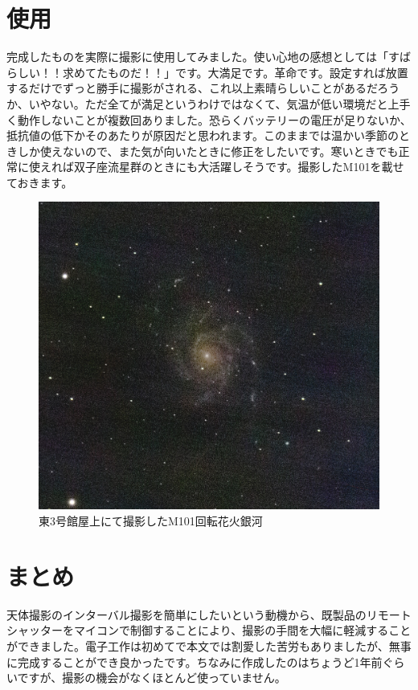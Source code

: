 \documentclass[../main]{subfiles}
\begin{document}
\section{使用}
完成したものを実際に撮影に使用してみました。使い心地の感想としては「すばらしい！！求めてたものだ！！」です。大満足です。革命です。設定すれば放置するだけでずっと勝手に撮影がされる、これ以上素晴らしいことがあるだろうか、いやない。ただ全てが満足というわけではなくて、気温が低い環境だと上手く動作しないことが複数回ありました。恐らくバッテリーの電圧が足りないか、抵抗値の低下かそのあたりが原因だと思われます。このままでは温かい季節のときしか使えないので、また気が向いたときに修正をしたいです。寒いときでも正常に使えれば双子座流星群のときにも大活躍しそうです。撮影したM101を載せておきます。
\begin{figure}[H]
    \centering
    \includegraphics[width=0.5\linewidth]{sections/Maruyama/figure/M101_0529_4.jpg}
    \caption{東3号館屋上にて撮影したM101回転花火銀河}
\end{figure}


\section{まとめ}
天体撮影のインターバル撮影を簡単にしたいという動機から、既製品のリモートシャッターをマイコンで制御することにより、撮影の手間を大幅に軽減することができました。電子工作は初めてで本文では割愛した苦労もありましたが、無事に完成することができ良かったです。ちなみに作成したのはちょうど1年前ぐらいですが、撮影の機会がなくほとんど使っていません。

\end{document}
